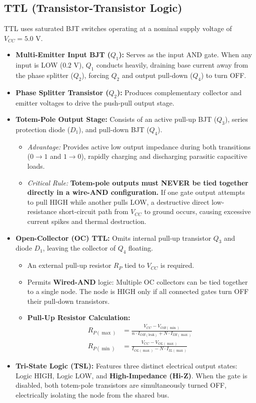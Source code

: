 \documentclass[12pt,a4paper]{article}
\begin{document}
\subsection{TTL (Transistor-Transistor Logic)}
TTL uses saturated BJT switches operating at a nominal supply voltage of $V_{CC} = 5.0\text{ V}$.
\begin{itemize}[leftmargin=*, itemsep=3pt]
  \item \textbf{Multi-Emitter Input BJT ($Q_1$):} Serves as the input AND gate. When any input is LOW ($0.2\text{ V}$), $Q_1$ conducts heavily, draining base current away from the phase splitter ($Q_2$), forcing $Q_2$ and output pull-down ($Q_4$) to turn OFF.
  \item \textbf{Phase Splitter Transistor ($Q_2$):} Produces complementary collector and emitter voltages to drive the push-pull output stage.
  \item \textbf{Totem-Pole Output Stage:} Consists of an active pull-up BJT ($Q_3$), series protection diode ($D_1$), and pull-down BJT ($Q_4$).
    \begin{itemize}
      \item \textit{Advantage:} Provides active low output impedance during both transitions ($0 \to 1$ and $1 \to 0$), rapidly charging and discharging parasitic capacitive loads.
      \item \textit{Critical Rule:} \textbf{Totem-pole outputs must NEVER be tied together directly in a wire-AND configuration.} If one gate output attempts to pull HIGH while another pulls LOW, a destructive direct low-resistance short-circuit path from $V_{CC}$ to ground occurs, causing excessive current spikes and thermal destruction.
    \end{itemize}
  \item \textbf{Open-Collector (OC) TTL:} Omits internal pull-up transistor $Q_3$ and diode $D_1$, leaving the collector of $Q_4$ floating.
    \begin{itemize}
      \item An external pull-up resistor $R_P$ tied to $V_{CC}$ is required.
      \item Permits \textbf{Wired-AND} logic: Multiple OC collectors can be tied together to a single node. The node is HIGH only if all connected gates turn OFF their pull-down transistors.
      \item \textbf{Pull-Up Resistor Calculation:}
      \begin{align}
        R_{P(\max)} &= \frac{V_{CC} - V_{OH(\min)}}{n \cdot I_{OH(\text{leak})} + N \cdot I_{IH(\max)}} \\
        R_{P(\min)} &= \frac{V_{CC} - V_{OL(\max)}}{I_{OL(\max)} - N \cdot I_{IL(\max)}}
      \end{align}
    \end{itemize}
  \item \textbf{Tri-State Logic (TSL):} Features three distinct electrical output states: Logic HIGH, Logic LOW, and \textbf{High-Impedance (Hi-Z)}. When the gate is disabled, both totem-pole transistors are simultaneously turned OFF, electrically isolating the node from the shared bus.
\end{itemize}
\end{document}
